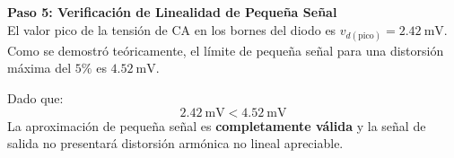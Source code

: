 \documentclass[11pt, a4paper]{article}
\begin{document}
\noindent\textbf{Paso 5: Verificación de Linealidad de Pequeña Señal}\\
El valor pico de la tensión de CA en los bornes del diodo es $v_{d(\text{pico})} = \qty{2.42}{\milli\volt}$. Como se demostró teóricamente, el límite de pequeña señal para una distorsión máxima del $5\%$ es $\qty{4.52}{\milli\volt}$. 

Dado que:
\begin{equation*}
    \qty{2.42}{\milli\volt} < \qty{4.52}{\milli\volt}
\end{equation*}
La aproximación de pequeña señal es \textbf{completamente válida} y la señal de salida no presentará distorsión armónica no lineal apreciable.
\end{document}
